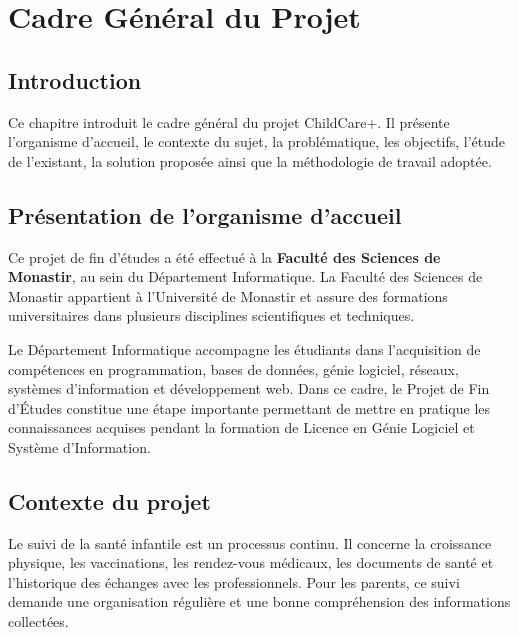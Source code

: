 \chapter{Cadre Général du Projet}
\label{chap:cadre-general}

\section*{Introduction}
Ce chapitre introduit le cadre général du projet ChildCare+. Il présente l'organisme d'accueil, le contexte du sujet, la problématique, les objectifs, l'étude de l'existant, la solution proposée ainsi que la méthodologie de travail adoptée.

\section{Présentation de l'organisme d'accueil}
\label{sec:organisme}

Ce projet de fin d'études a été effectué à la \textbf{Faculté des Sciences de Monastir}, au sein du Département Informatique. La Faculté des Sciences de Monastir appartient à l'Université de Monastir et assure des formations universitaires dans plusieurs disciplines scientifiques et techniques.

Le Département Informatique accompagne les étudiants dans l'acquisition de compétences en programmation, bases de données, génie logiciel, réseaux, systèmes d'information et développement web. Dans ce cadre, le Projet de Fin d'Études constitue une étape importante permettant de mettre en pratique les connaissances acquises pendant la formation de Licence en Génie Logiciel et Système d'Information.

\section{Contexte du projet}
\label{sec:contexte}

Le suivi de la santé infantile est un processus continu. Il concerne la croissance physique, les vaccinations, les rendez-vous médicaux, les documents de santé et l'historique des échanges avec les professionnels. Pour les parents, ce suivi demande une organisation régulière et une bonne compréhension des informations collectées.

